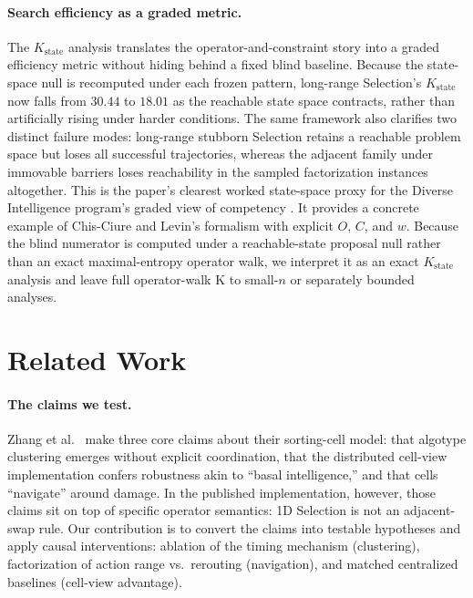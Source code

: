 \documentclass[11pt]{article}
\begin{document}
\paragraph{Search efficiency as a graded metric.}
The $K_{\mathrm{state}}$ analysis translates the operator-and-constraint story into a graded efficiency metric without
hiding behind a fixed blind
baseline. Because the state-space null is recomputed under each frozen pattern, long-range
Selection's $K_{\mathrm{state}}$ now falls from $30.44$ to $18.01$ as the reachable state space contracts, rather than
artificially rising under harder conditions. The same framework also clarifies two distinct
failure modes: long-range stubborn Selection retains a reachable problem space but loses all
successful trajectories, whereas the adjacent family under immovable barriers loses reachability in
the sampled factorization instances altogether.
This is the paper's clearest worked state-space proxy for the Diverse Intelligence program's graded
view of competency \cite{levin2022technological,fields2022competency}. It provides a concrete
example of Chis-Ciure and Levin's formalism \cite{chisciure2025cognition} with explicit $O$, $C$,
and $w$. Because the blind numerator is computed under a reachable-state proposal null rather than
an exact maximal-entropy operator walk, we interpret it as an exact $K_{\mathrm{state}}$ analysis
and leave full operator-walk K to small-$n$ or separately bounded analyses.

\section{Related Work}
\label{sec:related}

\paragraph{The claims we test.}
Zhang et al.\ \cite{zang2024classical} make three core claims about their sorting-cell model:
that algotype clustering emerges without explicit coordination, that the
distributed cell-view implementation confers robustness akin to ``basal intelligence,'' and that
cells ``navigate'' around damage. In the published implementation, however, those claims sit on top
of specific operator semantics: 1D Selection is not an adjacent-swap rule. Our contribution is to
convert the claims into testable hypotheses and apply causal interventions: ablation of the timing
mechanism (clustering), factorization of action range vs.\ rerouting (navigation), and matched
centralized baselines (cell-view advantage).
\end{document}
